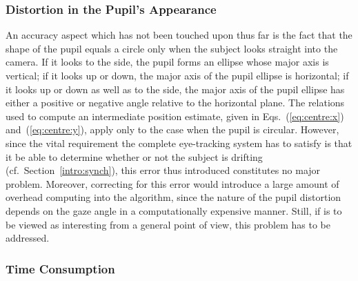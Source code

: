 
\subsubsection{Distortion in the Pupil's Appearance}

An accuracy aspect which has not been touched upon thus far is the
fact that the shape of the pupil equals a circle only when the subject
looks straight into the camera.  If it looks to the side, the pupil
forms an ellipse whose major axis is vertical; if it looks up or down,
the major axis of the pupil ellipse is horizontal; if it looks up or
down as well as to the side, the major axis of the pupil ellipse has
either a positive or negative angle relative to the horizontal plane.
The relations used to compute an intermediate position estimate, given
in Eqs.~(\ref{eq:centre:x}) and~(\ref{eq:centre:y}), apply only to the
case when the pupil is circular.  However, since the vital requirement
the complete eye-tracking system has to satisfy is that it be able to
determine whether or not the subject is drifting (cf.\ 
Section~\ref{intro:synch}), this error thus introduced constitutes no
major problem.  Moreover, correcting for this error would introduce a
large amount of overhead computing into the algorithm, since the
nature of the pupil distortion depends on the gaze angle in a
computationally expensive manner.  Still, if {\octopus} is to be
viewed as interesting from a general point of view, this problem has
to be addressed.

\subsubsection{Time Consumption}

